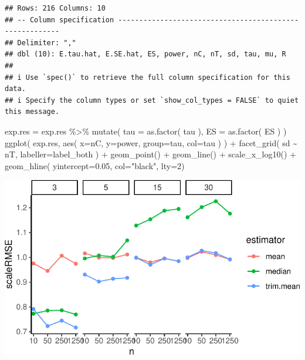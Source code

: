 \documentclass[
]{book}
\newenvironment{Shaded}{\begin{snugshade}}{\end{snugshade}}
\newcommand{\AttributeTok}[1]{\textcolor[rgb]{0.77,0.63,0.00}{#1}}
\newcommand{\DecValTok}[1]{\textcolor[rgb]{0.00,0.00,0.81}{#1}}
\newcommand{\FloatTok}[1]{\textcolor[rgb]{0.00,0.00,0.81}{#1}}
\newcommand{\FunctionTok}[1]{\textcolor[rgb]{0.00,0.00,0.00}{#1}}
\newcommand{\NormalTok}[1]{#1}
\newcommand{\OtherTok}[1]{\textcolor[rgb]{0.56,0.35,0.01}{#1}}
\newcommand{\SpecialCharTok}[1]{\textcolor[rgb]{0.00,0.00,0.00}{#1}}
\newcommand{\StringTok}[1]{\textcolor[rgb]{0.31,0.60,0.02}{#1}}
\begin{document}
\begin{verbatim}
## Rows: 216 Columns: 10
## -- Column specification --------------------------------------------------------
## Delimiter: ","
## dbl (10): E.tau.hat, E.SE.hat, ES, power, nC, nT, sd, tau, mu, R
## 
## i Use `spec()` to retrieve the full column specification for this data.
## i Specify the column types or set `show_col_types = FALSE` to quiet this message.
\end{verbatim}

\begin{Shaded}
\begin{Highlighting}[]
\NormalTok{exp.res }\OtherTok{=}\NormalTok{ exp.res }\SpecialCharTok{\%\textgreater{}\%} \FunctionTok{mutate}\NormalTok{( }\AttributeTok{tau =} \FunctionTok{as.factor}\NormalTok{( tau ),}
                              \AttributeTok{ES =} \FunctionTok{as.factor}\NormalTok{( ES ) )}
\FunctionTok{ggplot}\NormalTok{( exp.res, }\FunctionTok{aes}\NormalTok{( }\AttributeTok{x=}\NormalTok{nC, }\AttributeTok{y=}\NormalTok{power, }\AttributeTok{group=}\NormalTok{tau, }\AttributeTok{col=}\NormalTok{tau ) ) }\SpecialCharTok{+}
  \FunctionTok{facet\_grid}\NormalTok{( sd }\SpecialCharTok{\textasciitilde{}}\NormalTok{ nT, }\AttributeTok{labeller=}\NormalTok{label\_both ) }\SpecialCharTok{+}
  \FunctionTok{geom\_point}\NormalTok{() }\SpecialCharTok{+} \FunctionTok{geom\_line}\NormalTok{() }\SpecialCharTok{+}
  \FunctionTok{scale\_x\_log10}\NormalTok{() }\SpecialCharTok{+}
  \FunctionTok{geom\_hline}\NormalTok{( }\AttributeTok{yintercept=}\FloatTok{0.05}\NormalTok{, }\AttributeTok{col=}\StringTok{"black"}\NormalTok{, }\AttributeTok{lty=}\DecValTok{2}\NormalTok{)}
\end{Highlighting}
\end{Shaded}

\begin{center}\includegraphics[width=0.75\linewidth]{Designing-Simulations-in-R_files/figure-latex/unnamed-chunk-198-1} \end{center}
\end{document}
